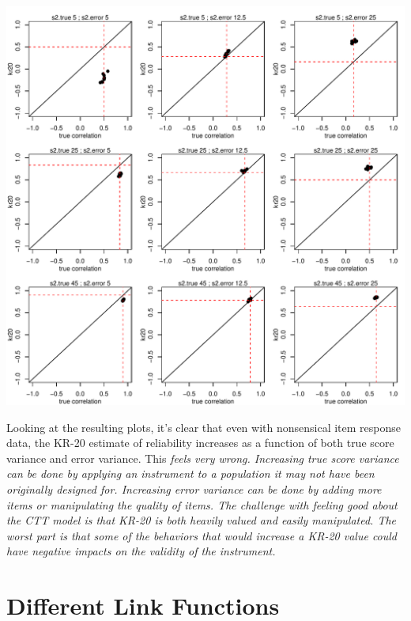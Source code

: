 \documentclass{article}\usepackage[]{graphicx}\usepackage[]{color}
\makeatletter
\def\maxwidth{ %
  \ifdim\Gin@nat@width>\linewidth
    \linewidth
  \else
    \Gin@nat@width
  \fi
}
\newenvironment{knitrout}{}{} %
\makeatother
\begin{document}
\begin{knitrout}
\color{fgcolor}
\includegraphics[width=\maxwidth]{figure/unnamed-chunk-4-1} 

\end{knitrout}

Looking at the resulting plots, it's clear that even with nonsensical item response data, the KR-20 estimate of reliability increases as a function of both true score variance and error variance.  This \em feels \em very wrong.  Increasing true score variance can be done by applying an instrument to a population it may not have been originally designed for.  Increasing error variance can be done by adding more items or manipulating the quality of items.  The challenge with feeling good about the CTT model is that KR-20 is both heavily valued and easily manipulated.  The worst part is that some of the behaviors that would increase a KR-20 value could have negative impacts on the validity of the instrument.

\pagebreak
\section{Different Link Functions}
\end{document}
